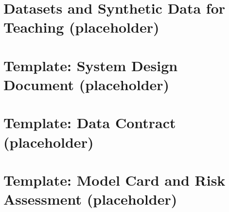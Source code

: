 \documentclass[11pt]{book}
\begin{document}
\mainmatter















\appendix
\chapter{Datasets and Synthetic Data for Teaching (placeholder)}
\chapter{Template: System Design Document (placeholder)}
\chapter{Template: Data Contract (placeholder)}
\chapter{Template: Model Card and Risk Assessment (placeholder)}

\backmatter





\end{document}
